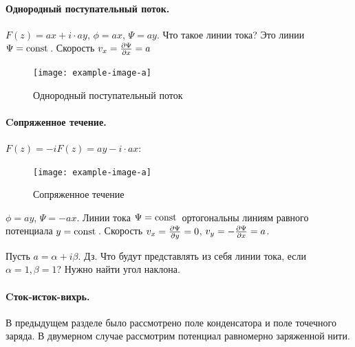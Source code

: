 \paragraph{Однородный поступательный поток.} $F(z)=ax+i\cdot ay$, $\phi=ax$, $\Psi=ay$. Что такое линии тока? Это линии $\Psi=\mathrm{const}\,$. Скорость $v_x=\pdv{\Psi}{x}=a$

\begin{figure}[h!]
    \centering
    \texttt{[image: example-image-a]}
    \caption{Однородный поступательный поток}
    \label{fig:figure1}
\end{figure}





\paragraph{Cопряженное течение.} $F(z)=-iF(z)=ay - i\cdot ax$:

\begin{figure}[h!]
    \centering
    \texttt{[image: example-image-a]}
    \caption{Сопряженное течение}
    \label{fig:figure1}
\end{figure}
$\phi=ay$, $\Psi=-ax$. Линии тока $\Psi=\mathrm{const}\,$ ортогональны линиям равного потенциала $y=\mathrm{const}\,$. Скорость $v_x=\pdv{\Psi}{y}=0$, $v_y=-\pdv{\Psi}{x}=a$.

Пусть $a=\alpha + i\beta$.
Дз. Что будут представлять из себя линии тока, если $\alpha=1,\beta=1$? Нужно найти угол наклона.

\paragraph{Cток-исток-вихрь.} В предыдущем разделе было рассмотрено поле конденсатора и поле точечного заряда. В двумерном случае рассмотрим потенциал равномерно заряженной нити.

